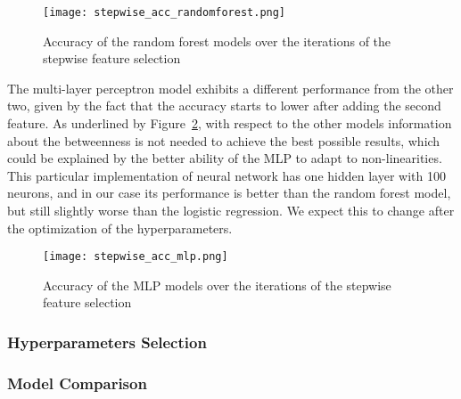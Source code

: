 \begin{figure}[H]
	\centering
	\texttt{[image: stepwise\_acc\_randomforest.png]}
	\caption{Accuracy of the random forest models over the iterations of the stepwise feature selection}\label{fig:stepwise_acc_randomforest}
\end{figure}
\noindent
The multi-layer perceptron model exhibits a different performance from the other two,
given by the fact that the accuracy starts to lower after adding the second feature.
As underlined by Figure~\ref{fig:stepwise_acc_mlp}, with respect to the other models information about the betweenness
is not needed to achieve the best possible results, which could be explained by the better ability of the MLP to adapt to non-linearities.
This particular implementation of neural network has one hidden layer with 100 neurons, and in our case its performance is better
than the random forest model, but still slightly worse than the logistic regression. We expect this to change after the optimization of the hyperparameters.

\begin{figure}[H]
	\centering
	\texttt{[image: stepwise\_acc\_mlp.png]}
	\caption{Accuracy of the MLP models over the iterations of the stepwise feature selection}\label{fig:stepwise_acc_mlp}
\end{figure}


\subsubsection*{Hyperparameters Selection}


\subsubsection*{Model Comparison}\label{subsubsec:results_ML_model_comparison}

